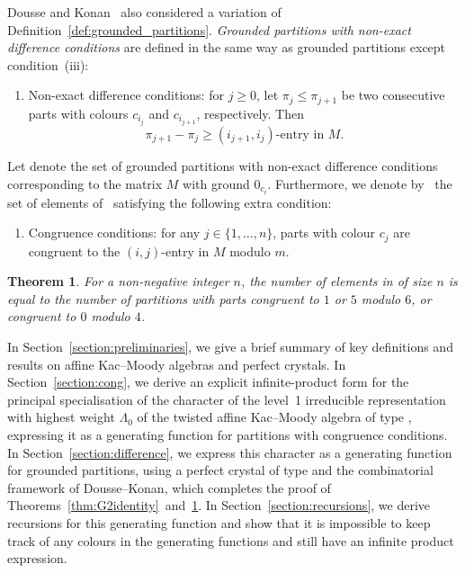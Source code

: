 \documentclass[10pt,a4paper]{amsart}
\numberwithin{equation}{section}
\newtheorem{Theorem}{Theorem}[section]
\theoremstyle{definition}
\begin{document}
Dousse and Konan~\cite{DK19b} also considered a variation of Definition~\ref{def:grounded_partitions}. \emph{Grounded partitions with non-exact difference conditions} are defined in the same way as grounded partitions except condition~(iii):
\begin{enumerate}\itemsep=0pt
\item[(iii$'$)] Non-exact difference conditions: for $ j \geq 0 $, let
 $\pi_{j}\leq\pi_{j+1}$ be two consecutive parts with
 colours $c_{i_j}$ and $c_{i_{j+1}}$, respectively. Then
 \[
 \pi_{j+1}-\pi_{j} \geq (i_{j+1},i_j)\text{-entry in } M.
 \]
\end{enumerate}
Let  denote the set of grounded partitions with non-exact difference conditions corresponding to the matrix $M$ with ground $0_{c_i}$. Furthermore, we denote by~ the set of elements of~ satisfying the following extra condition:
\begin{enumerate}\itemsep=0pt
\item[(iv)] Congruence conditions: for any $j\in\{1,\ldots,n\}$, parts with colour $c_j$ are congruent to the $ (i,j)$-entry in $M$ modulo $m$.
\end{enumerate}



\begin{Theorem}\label{thm:G2identity_geq}
For a non-negative integer $n$, the number of elements in  of size $n$ is equal to the number of partitions with parts congruent to $1$ or $5$ modulo $6$, or congruent to $0$ modulo $4$.
\end{Theorem}


In Section~\ref{section:preliminaries}, we give a brief summary of key definitions and results on affine Kac--Moody algebras and perfect crystals. In Section~\ref{section:cong}, we derive an explicit infinite-product form for the principal specialisation of the character of the level~1 irreducible representation with highest weight $\Lambda_0$ of the twisted affine Kac--Moody algebra of type , expressing it as a generating function for partitions with congruence conditions. In Section~\ref{section:difference}, we express this character as a generating function for grounded partitions, using a perfect crystal of type  and the combinatorial framework of Dousse--Konan, which completes the proof of Theorems~\ref{thm:G2identity}~and~\ref{thm:G2identity_geq}. In Section~\ref{section:recursions}, we derive recursions for this generating function and show that it is impossible to keep track of any colours in the generating functions and still have an infinite product expression.
\end{document}
